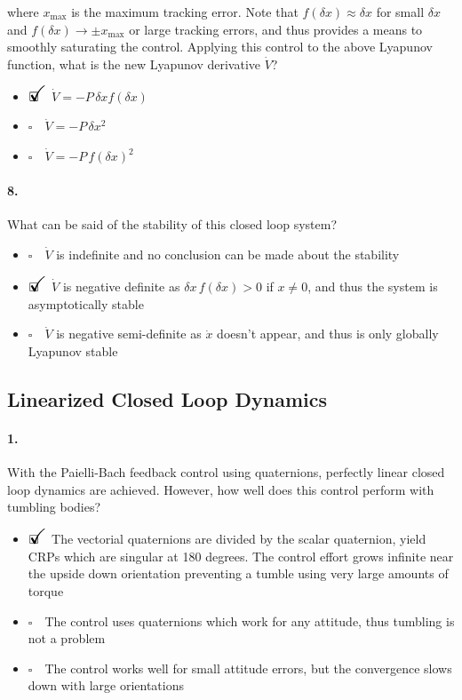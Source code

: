 \documentclass[12pt, a4paper]{article}
\newcommand{\ans}{\item[]$\rlap{\LARGE{\checkmark}}\square\quad$}
\newcommand{\noans}{\item[]$\square\quad$}
\begin{document}
where $x_{\text{max}}$ is the maximum tracking error. Note that $f(\delta x) \approx \delta x$ for small $\delta x$ and $f(\delta x) \rightarrow \pm x_{\text{max}}$ or large tracking errors, and thus provides a means to smoothly saturating the control.  Applying this control to the above Lyapunov function, what is the new Lyapunov derivative $\dot{V}$?

\begin{itemize}
\ans $\dot{V} = -P\,\delta x f(\delta x)$
\noans $\dot{V} = -P\,\delta x^{2}$
\noans $\dot{V} = -P\,f(\delta x)^{2}$
\end{itemize}

\paragraph{8.}
What can be said of the stability of this closed loop system?

\begin{itemize}
\noans $\dot{V}$ is indefinite and no conclusion can be made
about the stability
\ans $\dot{V}$ is negative definite as $\delta x \, f(\delta x) > 0$ if $x \neq 0$, and thus the system is asymptotically stable
\noans $\dot{V}$ is negative semi-definite as $\dot{x}$ doesn't appear, and thus is only globally Lyapunov stable
\end{itemize}

\newpage
\subsection{Linearized Closed Loop Dynamics}
\paragraph{1.}
With the Paielli-Bach feedback control using quaternions, perfectly linear closed loop dynamics are achieved. However, how well does this control perform with tumbling bodies?

\begin{itemize}
\ans The vectorial quaternions are divided by the scalar quaternion, yield CRPs which are singular at 180 degrees.  The control effort grows infinite near the upside down orientation preventing a tumble using very large amounts of torque
\noans The control uses quaternions which work for any attitude, thus tumbling is not a problem
\noans The control works well for small attitude errors, but the convergence slows down with large orientations
\end{itemize}
\end{document}

